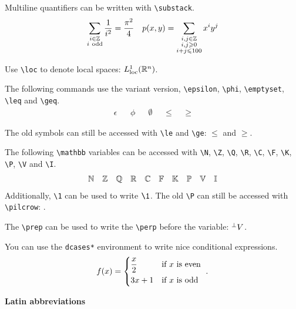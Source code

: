 \documentclass{myassignment}
\begin{document}
Multiline quantifiers can be written with \texttt{\textbackslash substack}.
\begin{align*}
    \sum_{\substack{i \in \mathbb{Z} \\ i~\text{odd}}} \frac{1}{i^2} = \frac{\pi^2}{4} && p(x, y) = \sum_{\substack{i, j \in \mathbb{Z} \\ i, j \geqslant 0 \\ i + j \leqslant 100}} x^i y^j
\end{align*}

Use \texttt{\textbackslash loc} to denote local spaces: $L_{\mathrm{loc}}^1(\mathbb{R}^n)$.

The following commands use the variant version, \texttt{\textbackslash epsilon}, \texttt{\textbackslash phi}, \texttt{\textbackslash emptyset}, \texttt{\textbackslash leq} and \texttt{\textbackslash geq}.
\begin{align*}
    \epsilon && \phi && \emptyset && \leq && \geq
\end{align*}

The old symbols can still be accessed with \texttt{\textbackslash le} and \texttt{\textbackslash ge}: $\le$ and $\ge$.

The following \texttt{\textbackslash mathbb} variables can be accessed with \texttt{\textbackslash N}, \texttt{\textbackslash Z}, \texttt{\textbackslash Q}, \texttt{\textbackslash R}, \texttt{\textbackslash C}, \texttt{\textbackslash F}, \texttt{\textbackslash K}, \texttt{\textbackslash P}, \texttt{\textbackslash V} and \texttt{\textbackslash I}.
\begin{align*}
    \mathbb{N} && \mathbb{Z} && \mathbb{Q} && \mathbb{R} && \mathbb{C} && \mathbb{F} && \mathbb{K} && \mathbb{P} && \mathbb{V} && \mathbb{I}
\end{align*}
Additionally, \texttt{\textbackslash 1} can be used to write $\1$. The old \texttt{\textbackslash P} can still be accessed with \texttt{\textbackslash pilcrow}: \pilcrow.

The \texttt{\textbackslash prep} can be used to write the \texttt{\textbackslash perp} before the variable: ${}^\perp V$.

You can use the \texttt{dcases*} environment to write nice conditional expressions.
\begin{align*}
    f(x) = \begin{dcases*}
        \frac{x}{2} & if $x$ is even \\
        3x + 1 & if $x$ is odd
    \end{dcases*}.
\end{align*}

\textbf{Latin abbreviations}
\end{document}
